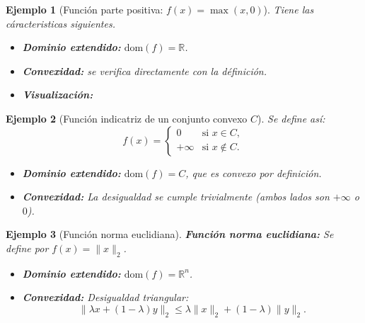 \documentclass[12pt]{book}
\newtheorem{ex}{Ejemplo}
\theoremstyle{definition}
\theoremstyle{plain}
\theoremstyle{remark}
\begin{document}
\begin{ex}[Función parte positiva: \( f(x) = \max(x, 0) \)] Tiene las c\'aracteristicas siguientes.
\begin{itemize}
    \item \textbf{Dominio extendido:} \( \text{dom}(f) = \mathbb{R} \).
    \item \textbf{Convexidad:} %
    se verifica directamente con la d\'efinici\'on.
    \item \textbf{Visualización:}
\end{itemize}

\begin{center}
\end{center}
\end{ex}

\begin{ex}[Función indicatriz de un conjunto convexo \( C \)]
Se define as\'i:
    \[
    f(x) = \begin{cases}
    0 & \text{si } x \in C, \\
    +\infty & \text{si } x \notin C.
    \end{cases}
    \]
    \begin{itemize}
        \item \textbf{Dominio extendido:} \( \text{dom}(f) = C \), que es convexo por definición.
        \item \textbf{Convexidad:} La desigualdad se cumple trivialmente (ambos lados son \( +\infty \) o \( 0 \)).
    \end{itemize}
\end{ex}

\begin{ex}
[Función norma euclidiana]  

  \textbf{Función norma euclidiana:} Se define por \( f(x) = \|x\|_2 \).
    \begin{itemize}
        \item \textbf{Dominio extendido:} \( \text{dom}(f) = \mathbb{R}^n \).
        \item \textbf{Convexidad:} Desigualdad triangular:
        \[
        \|\lambda x + (1-\lambda)y\|_2 \leq \lambda \|x\|_2 + (1-\lambda)\|y\|_2.
        \]
    \end{itemize}
\end{ex}
\end{document}
